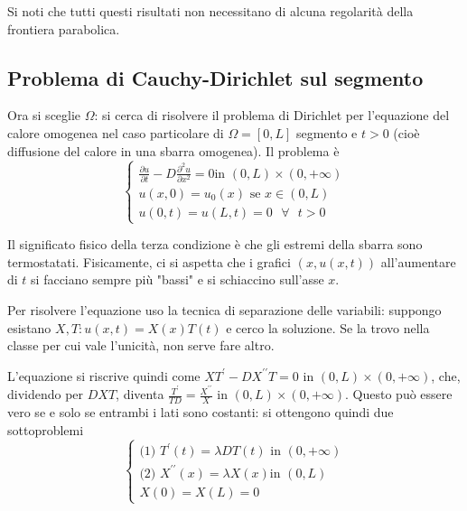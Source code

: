 \documentclass{article}
\begin{document}
Si noti che tutti questi risultati non necessitano di alcuna regolarit\`{a}
della frontiera parabolica.

\subsection{Problema di Cauchy-Dirichlet sul segmento}

Ora si sceglie $\Omega $: si cerca di risolvere il problema di Dirichlet per
l'equazione del calore omogenea nel caso particolare di $\Omega =\left[ 0,L%
\right] $ segmento e $t>0$ (cio\`{e} diffusione del calore in una sbarra
omogenea). Il problema \`{e} 
\begin{equation*}
\left\{ 
\begin{array}{c}
\frac{\partial u}{\partial t}-D\frac{\partial ^{2}u}{\partial x^{2}}=0\text{
in }\left( 0,L\right) \times \left( 0,+\infty \right) \\ 
u\left( x,0\right) =u_{0}\left( x\right) \text{ se }x\in \left( 0,L\right)
\\ 
u\left( 0,t\right) =u\left( L,t\right) =0\text{ }\forall \text{ }t>0%
\end{array}%
\right.
\end{equation*}

Il significato fisico della terza condizione \`{e} che gli estremi della
sbarra sono termostatati.
Fisicamente, ci si aspetta che i grafici $\left( x,u\left( x,t\right)
\right) $ all'aumentare di $t$ si facciano sempre pi\`{u} "bassi" e si
schiaccino sull'asse $x$.

Per risolvere l'equazione uso la tecnica di separazione delle variabili:
suppongo esistano $X,T:u\left( x,t\right) =X\left( x\right) T\left( t\right) 
$ e cerco la soluzione. Se la trovo nella classe per cui vale l'unicit\`{a},
non serve fare altro.

L'equazione si riscrive quindi come $XT^{\prime }-DX^{\prime \prime }T=0$ in 
$\left( 0,L\right) \times \left( 0,+\infty \right) $, che, dividendo per $%
DXT $, diventa $\frac{T^{\prime }}{TD}=\frac{X^{\prime \prime }}{X}$ in $%
\left( 0,L\right) \times \left( 0,+\infty \right) $. Questo pu\`{o} essere
vero se e solo se entrambi i lati sono costanti: si ottengono quindi due
sottoproblemi 
\begin{equation*}
\left\{ 
\begin{array}{c}
\text{(1) }T^{\prime }\left( t\right) =\lambda DT\left( t\right) \text{ in }%
\left( 0,+\infty \right) \\ 
\text{(2) }X^{\prime \prime }\left( x\right) =\lambda X\left( x\right) \text{
in }\left( 0,L\right) \\ 
X\left( 0\right) =X\left( L\right) =0%
\end{array}%
\right.
\end{equation*}
\end{document}
